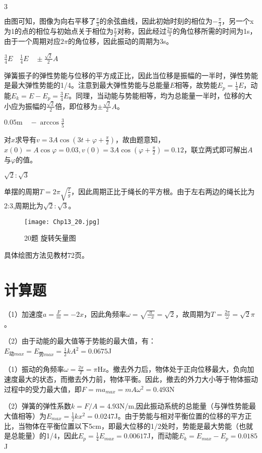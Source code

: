 \exercise $3$

\solve
由图可知，图像为向右平移了$\frac{\pi}{3}$的余弦曲线，因此初始时刻的相位为$-\frac{\pi}{3}$，另一个x为1的点的相位与初始点关于相位为$\frac{\pi}{2}$对称，因此经过$\frac{2\pi}{3}$的角位移所需的时间为1s，由于一个周期对应$2\pi$的角位移，因此振动的周期为3s。

\exercise $\frac{3}{4}E \quad \frac{1}{4}E \quad \pm\frac{\sqrt{2}}{2}A$

\solve
弹簧振子的弹性势能与位移的平方成正比，因此当位移是振幅的一半时，弹性势能是最大弹性势能的1/4。注意到最大弹性势能与总能量$E$相等，故势能$E_p=\frac{1}{4}E$，动能$E_k=E-E_p=\frac{3}{4}E$。同理，当动能与势能相等，均为总能量一半时，位移的大小应为振幅的$\frac{\sqrt{2}}{2}$倍，即位移为$\pm\frac{\sqrt{2}}{2}A$。

\exercise $0.05\mathrm{m}\quad -\arccos{\frac{3}{5}}$

\solve
对$x$求导有$v=3A\cos(3t+\varphi+\frac{\pi}{2})$，故由题意知，$x(0)=A\cos\varphi=0.03,v(0)=3A\cos(\varphi+\frac{\pi}{2})=0.12$，联立两式即可解出$A$与$\varphi$的值。

\exercise $\sqrt{2}:\sqrt{3}$

\solve
单摆的周期$T=2\pi\sqrt{\frac{l}{g}}$，因此周期正比于绳长的平方根。由于左右两边的绳长比为2:3,周期比为$\sqrt{2}:\sqrt{3}$。

\exercise

\solve
\begin{figure}[htb]
\centering
\texttt{[image: Chp13\_20.jpg]}
\caption{20题 旋转矢量图}
\end{figure}
具体绘图方法见教材72页。

\section{计算题}
\exercise

\solve
（1）加速度$a=\frac{F}{m}=-2x$，因此角频率$\omega=\sqrt{\frac{a}{-x}}=\sqrt{2}$，故周期为$T=\frac{2\pi}{\omega}=\sqrt{2}\pi$。

（2）由于动能的最大值等于势能的最大值，有：$E_{\text{动}max}=E_{\text{势}max}=\frac{1}{2}kA^2=0.0675$J

\exercise

\solve
（1）振动的角频率$\omega=\frac{2\pi}{T}=\pi$Hz。撤去外力后，物体处于正向位移最大，负向加速度最大的状态，而撤去外力前，物体平衡。因此，撤去的外力大小等于物体振动过程中的受力最大值，即$F=ma_{max}=mA\omega^2=0.493$N

（2）弹簧的弹性系数$k=F/A=4.93$N/m,因此振动系统的总能量（与弹性势能最大值相等）为$E_{max}=\frac{1}{2}kx^2=0.0247$J。由于势能与相对平衡位置的位移的平方正比，当物体在平衡位置以下5cm，即最大位移的1/2处时，势能是最大势能（也就是总能量）的1/4，因此$E_p=\frac{1}{4}E_{max}=0.00617$J，而动能$E_ k=E_{max}-E_ p=0.0185$J

